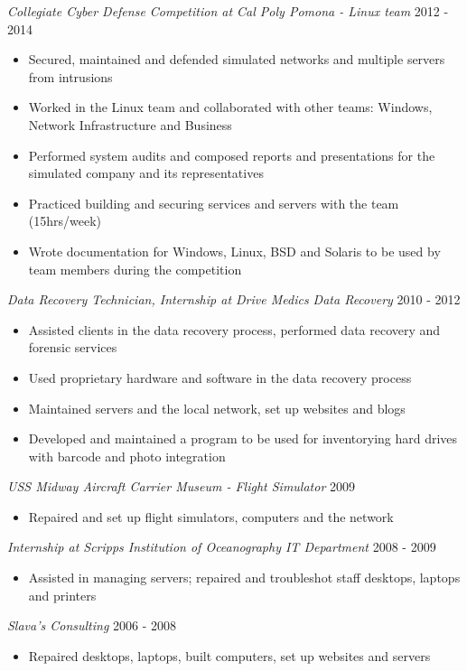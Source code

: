 \documentclass[line]{tex/res}
\begin{document}
\begin{resume}
    {\sl Collegiate Cyber Defense Competition at Cal Poly Pomona - Linux team} \hfill 2012 - 2014
	\begin{itemize} \itemsep -2pt
		\item Secured, maintained and defended simulated networks and multiple servers from intrusions
		\item Worked in the Linux team and collaborated with other teams: Windows, Network Infrastructure and Business
		\item Performed system audits and composed reports and presentations for the simulated company and its representatives
		\item Practiced building and securing services and servers with the team (15hrs/week)
		\item Wrote documentation for Windows, Linux, BSD and Solaris to be used by team members during the competition
	\end{itemize}

	{\sl Data Recovery Technician, Internship at Drive Medics Data Recovery} \hfill 2010 - 2012
	\begin{itemize} \itemsep -2pt
		\item Assisted clients in the data recovery process, performed data recovery and forensic services
		\item Used proprietary hardware and software in the data recovery process
		\item Maintained servers and the local network, set up websites and blogs
		\item Developed and maintained a program to be used for inventorying hard drives with barcode and photo integration
	\end{itemize}

	{\sl USS Midway Aircraft Carrier Museum - Flight Simulator} \hfill 2009
	\begin{itemize} \itemsep -2pt
		\item Repaired and set up flight simulators, computers and the network
	\end{itemize}

	{\sl Internship at Scripps Institution of Oceanography IT Department} \hfill 2008 - 2009
	\begin{itemize} \itemsep -2pt
		\item Assisted in managing servers; repaired and troubleshot staff desktops, laptops and printers
	\end{itemize}

	{\sl Slava's Consulting} \hfill 2006 - 2008
	\begin{itemize} \itemsep -2pt
		\item Repaired desktops, laptops, built computers, set up websites and servers
	\end{itemize}


\end{resume}
\end{document}

